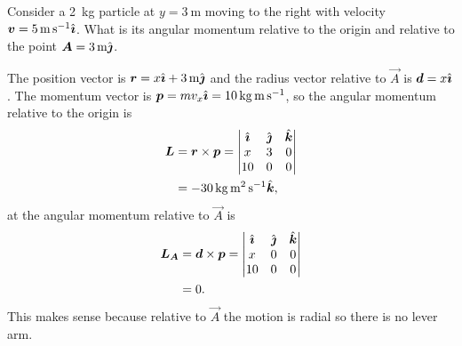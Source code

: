\documentclass[../classical_mechanics.tex]{subfiles}
\begin{document}
            \begin{example}
                Consider a \qty{2}{\kilogram} particle at $y=\qty{3}{\meter}$ moving to the right with velocity $\boldsymbol{v}=\qty{5}{\meter\per\second}\hat{\boldsymbol{\imath}}$.
                What is its angular momentum relative to the origin and relative to the point $\boldsymbol{A}=\qty{3}{\meter}\hat{\boldsymbol{\jmath}}$.
                \begin{figure}[H]
                    \centering
                \end{figure}
                The position vector is $\boldsymbol{r}=x\hat{\boldsymbol{\imath}}+\qty{3}{\meter}\hat{\boldsymbol{\jmath}}$ and the radius vector relative to $\vec{A}$ is $\boldsymbol{d}=x\hat{\boldsymbol{\imath}}$.
                The momentum vector is $\boldsymbol{p}=mv_x\hat{\boldsymbol{\imath}}=\qty{10}{\kilogram\meter\per\second}$, so the angular momentum relative to the origin is
                \begin{align}
                    \boldsymbol{L}&=\boldsymbol{r}\times\boldsymbol{p}=\begin{vmatrix}
                        \hat{\boldsymbol{\imath}} & \hat{\boldsymbol{\jmath}} & \hat{\boldsymbol{k}} \\
                        x & 3 & 0 \\
                        10 & 0 & 0
                    \end{vmatrix}\\
                    &=-\qty{30}{\kilogram\meter\squared\per\second}\hat{\boldsymbol{k}},
                \end{align}
                at the angular momentum relative to $\vec{A}$ is
                \begin{align}
                    \boldsymbol{L}_{\boldsymbol{A}}&=\boldsymbol{d}\times\boldsymbol{p}=\begin{vmatrix}
                        \hat{\boldsymbol{\imath}} & \hat{\boldsymbol{\jmath}} & \hat{\boldsymbol{k}} \\
                        x & 0 & 0 \\
                        10 & 0 & 0
                    \end{vmatrix}\\
                    &=0.
                \end{align}
                This makes sense because relative to $\vec{A}$ the motion is radial so there is no lever arm.
            \end{example}
\end{document}
